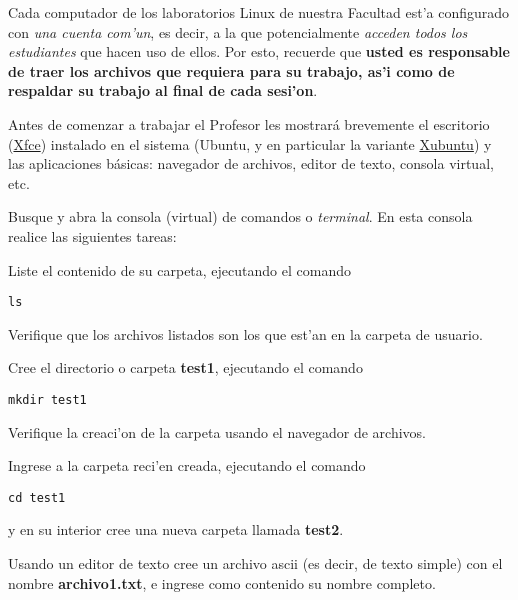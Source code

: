 \documentclass[11pt]{exam}
\begin{document}
\begin{questions}

\item Cada computador de los laboratorios Linux de nuestra Facultad est'a configurado con \textit{una cuenta com'un}, es decir, a la que potencialmente \textit{acceden todos los estudiantes} que hacen uso de ellos. Por esto, recuerde que \textbf{usted es responsable de traer los archivos que requiera para su trabajo, as'i como de respaldar su trabajo al final de cada sesi'on}.

\item Antes de comenzar a trabajar el Profesor les mostrar\'a brevemente
el escritorio (\href{http://www.xfce.org/?lang=es}{Xfce}) instalado en el sistema (Ubuntu, y en particular la variante \href{http://xubuntu.org/}{Xubuntu}) y las aplicaciones b\'asicas: navegador de archivos, editor de texto, consola virtual, etc.

\item Busque y abra la consola (virtual) de comandos o \textit{terminal}. En esta consola realice las siguientes tareas:
\begin{parts}
\item Liste el contenido de su carpeta, ejecutando el comando 

\begin{verbatim}
ls
\end{verbatim}

Verifique que los archivos listados son los que est'an en la carpeta de usuario.

\item Cree el directorio o carpeta \textbf{test1}, ejecutando el comando 

\begin{verbatim}
mkdir test1
\end{verbatim}

Verifique la creaci'on de la carpeta usando el navegador de archivos.

\item Ingrese a la carpeta reci'en creada, ejecutando el comando 

\begin{verbatim}
cd test1
\end{verbatim}

y en su interior cree una nueva carpeta llamada \textbf{test2}.

\item Usando un editor de texto cree un archivo ascii (es decir, de texto simple) con el nombre \textbf{archivo1.txt}, e ingrese como contenido su nombre completo.


\end{parts}
\end{questions}
\end{document}
